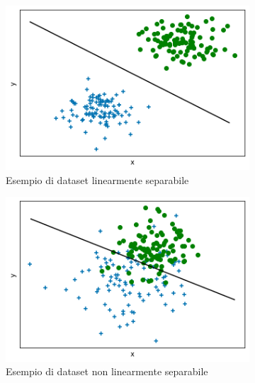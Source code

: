 \documentclass[../../main.tex]{subfiles}
\begin{document}
    \begin{figure}[H]
        \begin{subfigure}[]{0.49\textwidth}
            \centering
            \includegraphics[width=\textwidth]{immagini/4_1/class_linearly_separable.png} 
            \caption{Esempio di dataset linearmente separabile}
            \label{fig:linearly_sep_classification}      
        \end{subfigure}
        \begin{subfigure}[]{0.49\textwidth}
            \centering
            \includegraphics[width=\textwidth]{immagini/4_1/class_non_linearly_separable.png}    
            \caption{Esempio di dataset non linearmente separabile}
            \label{fig:non_linearly_sep_classification}    
        \end{subfigure}
        \caption{}
    \end{figure}
\end{document}
